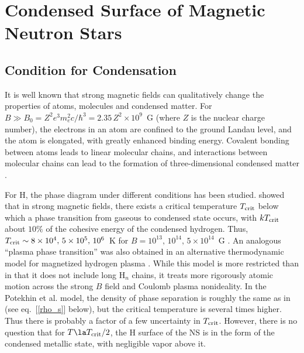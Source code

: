 \documentclass{emulateapj}
\begin{document}
\section{Condensed Surface of Magnetic Neutron Stars}
\label{sect:CondSurf}

\subsection{Condition for Condensation}
\label{sect:Condensation}

It is well known that strong magnetic fields can 
qualitatively change the properties of atoms, molecules and
condensed matter. For $B\gg B_0=Z^2 e^3 m_{e}^2 c /\hbar^3 =
2.35\,Z^2\times10^{9}$~G (where $Z$ is 
the nuclear charge number), the electrons in an atom are confined to
the ground Landau level, and the atom is elongated, with greatly enhanced
binding energy. Covalent bonding between atoms leads to linear molecular 
chains, and interactions between molecular chains can lead to the formation of
three-dimensional condensed matter
\citep[see][for a recent review]{Lai01}.

For H, the phase diagram under different conditions has been studied.  
\citet{LS97} showed 
that in strong magnetic fields,
there exists a critical temperature $T_{\rm crit}$ 
below which a phase transition from gaseous to condensed state occurs,
with $kT_{\rm crit}$ about $10\%$ of the cohesive energy of the 
condensed hydrogen. Thus, $T_{\rm crit}\sim 8\times 10^4,\,
5\times 10^5,\,10^6$~K for $B=10^{13},\,10^{14},\,5\times 10^{14}$~G
\citep{Lai01}. 
An analogous ``plasma phase transition'' was also obtained
in an alternative thermodynamic model for magnetized hydrogen plasma \citep{PCS}.
While this model is more restricted than \citet{LS97} 
in that it does not include long H$_n$ chains,
it treats more rigorously atomic motion across the strong $B$ field
and Coulomb plasma nonideality. In the Potekhin et al. model, the density
of phase separation is roughly the same as in \citet{LS97}
(see eq.~[\ref{rho_s}] below), but the critical temperature is
several times higher.
Thus there is probably a factor of a few uncertainty 
in $T_{\rm crit}$. However, there is no question that for $T\la T_{\rm crit}/2$,
the H surface of the NS is in the form of the condensed metallic state, 
with negligible vapor above it.
\end{document}

